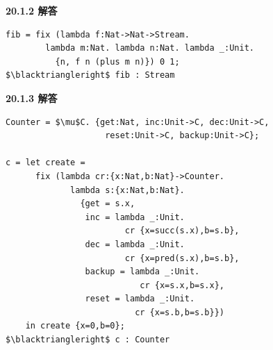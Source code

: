 \begin{taplauthorsolutionentrybox}
\label{sol:author:20.1.2}
\textbf{20.1.2 解答}

\begin{lstlisting}[mathescape=true]
fib = fix (lambda f:Nat->Nat->Stream.
        lambda m:Nat. lambda n:Nat. lambda _:Unit.
          {n, f n (plus m n)}) 0 1;
$\blacktriangleright$ fib : Stream
\end{lstlisting}


\end{taplauthorsolutionentrybox}

\begin{taplauthorsolutionentrybox}
\label{sol:author:20.1.3}
\textbf{20.1.3 解答}

\begin{lstlisting}[mathescape=true]
Counter = $\mu$C. {get:Nat, inc:Unit->C, dec:Unit->C,
                    reset:Unit->C, backup:Unit->C};

c = let create =
      fix (lambda cr:{x:Nat,b:Nat}->Counter.
             lambda s:{x:Nat,b:Nat}.
               {get = s.x,
                inc = lambda _:Unit.
                        cr {x=succ(s.x),b=s.b},
                dec = lambda _:Unit.
                        cr {x=pred(s.x),b=s.b},
                backup = lambda _:Unit.
                           cr {x=s.x,b=s.x},
                reset = lambda _:Unit.
                          cr {x=s.b,b=s.b}})
    in create {x=0,b=0};
$\blacktriangleright$ c : Counter
\end{lstlisting}

\end{taplauthorsolutionentrybox}

